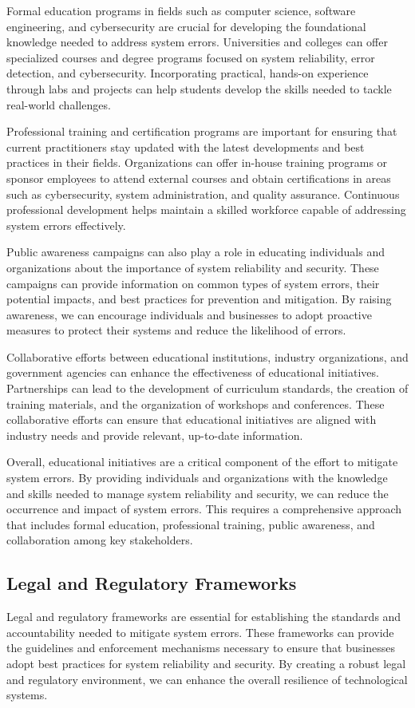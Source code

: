 \documentclass[10pt, conference, letterpaper]{IEEEtran}
\begin{document}
Formal education programs in fields such as computer science, software engineering, and cybersecurity are crucial for developing the foundational knowledge needed to address system errors. Universities and colleges can offer specialized courses and degree programs focused on system reliability, error detection, and cybersecurity. Incorporating practical, hands-on experience through labs and projects can help students develop the skills needed to tackle real-world challenges.

Professional training and certification programs are important for ensuring that current practitioners stay updated with the latest developments and best practices in their fields. Organizations can offer in-house training programs or sponsor employees to attend external courses and obtain certifications in areas such as cybersecurity, system administration, and quality assurance. Continuous professional development helps maintain a skilled workforce capable of addressing system errors effectively.

Public awareness campaigns can also play a role in educating individuals and organizations about the importance of system reliability and security. These campaigns can provide information on common types of system errors, their potential impacts, and best practices for prevention and mitigation. By raising awareness, we can encourage individuals and businesses to adopt proactive measures to protect their systems and reduce the likelihood of errors.

Collaborative efforts between educational institutions, industry organizations, and government agencies can enhance the effectiveness of educational initiatives. Partnerships can lead to the development of curriculum standards, the creation of training materials, and the organization of workshops and conferences. These collaborative efforts can ensure that educational initiatives are aligned with industry needs and provide relevant, up-to-date information.

Overall, educational initiatives are a critical component of the effort to mitigate system errors. By providing individuals and organizations with the knowledge and skills needed to manage system reliability and security, we can reduce the occurrence and impact of system errors. This requires a comprehensive approach that includes formal education, professional training, public awareness, and collaboration among key stakeholders.

\subsection{Legal and Regulatory Frameworks}
Legal and regulatory frameworks are essential for establishing the standards and accountability needed to mitigate system errors. These frameworks can provide the guidelines and enforcement mechanisms necessary to ensure that businesses adopt best practices for system reliability and security. By creating a robust legal and regulatory environment, we can enhance the overall resilience of technological systems.
\end{document}
